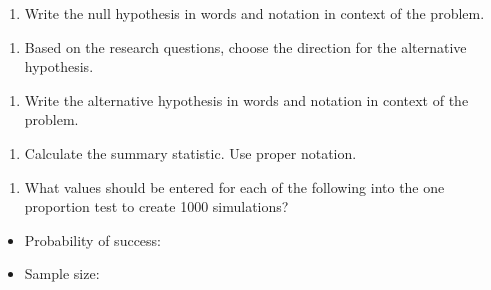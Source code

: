 \documentclass[
]{report}
\providecommand{\tightlist}{%
  \setlength{\itemsep}{0pt}\setlength{\parskip}{0pt}}
\begin{document}
\vspace{0.8in}

\begin{enumerate}
\def\labelenumi{\arabic{enumi}.}
\setcounter{enumi}{1}
\tightlist
\item
  Write the null hypothesis in words and notation in context of the problem.
\end{enumerate}

\vspace{1in}

\begin{enumerate}
\def\labelenumi{\arabic{enumi}.}
\setcounter{enumi}{2}
\tightlist
\item
  Based on the research questions, choose the direction for the alternative hypothesis.
\end{enumerate}

\vspace{0.3in}

\begin{enumerate}
\def\labelenumi{\arabic{enumi}.}
\setcounter{enumi}{3}
\tightlist
\item
  Write the alternative hypothesis in words and notation in context of the problem.
\end{enumerate}

\vspace{1in}

\begin{enumerate}
\def\labelenumi{\arabic{enumi}.}
\setcounter{enumi}{4}
\tightlist
\item
  Calculate the summary statistic. Use proper notation.
\end{enumerate}

\vspace{0.3in}
\newpage

\begin{enumerate}
\def\labelenumi{\arabic{enumi}.}
\setcounter{enumi}{5}
\tightlist
\item
  What values should be entered for each of the following into the one proportion test to create 1000 simulations?
\end{enumerate}

\begin{itemize}
\tightlist
\item
  Probability of success:
\end{itemize}

\vspace{0.2in}

\begin{itemize}
\tightlist
\item
  Sample size:
\end{itemize}
\end{document}
